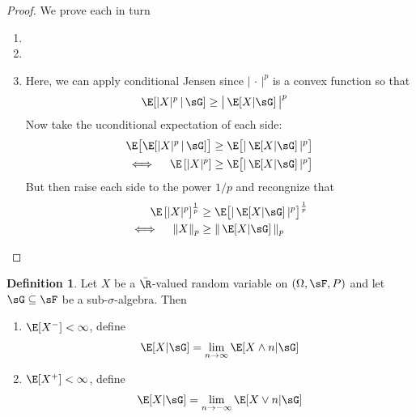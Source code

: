 \documentclass[12pt]{article}
\theoremstyle{plain}
\theoremstyle{definition}
\newtheorem{defn}[thm]{Definition}
\theoremstyle{remark}
\newcommand{\ra}{\rightarrow}
\newcommand{\limn}{\lim_{n\rightarrow\infty}}
\begin{document}
\begin{proof}
We prove each in turn
\begin{enumerate}[label=(\roman*)]
  \item
  \item
  \item Here, we can apply conditional Jensen since $|\,\cdot\,|^p$ is
    a convex function so that
    \begin{align*}
      \E[\lvert X\rvert^p\,|\,\sG]
      &\geq
      \big\lvert\,\E[X|\sG]\,\big\rvert^p
    \end{align*}
    Now take the uconditional expectation of each side:
    \begin{align*}
      \E\big[
      \E[\lvert X\rvert^p\,|\,\sG]
      \big]
      &\geq
      \E\big[
      \lvert\,\E[X|\sG]\,\rvert^p
      \big] \\
      \iff\quad
      \E\left[ \lvert X\rvert^p\right]
      &\geq
      \E\big[
      \lvert\,\E[X|\sG]\,\rvert^p
      \big]
    \end{align*}
    But then raise each side to the power $1/p$ and recongnize that
    \begin{align*}
      \E\left[ \lvert X\rvert^p\right]^{\frac{1}{p}}
      &\geq
      \E\big[
      \lvert\,\E[X|\sG]\,\rvert^p
      \big]^{\frac{1}{p}} \\
      \iff\quad
      \lVert X \rVert_p
      &\geq
      \lVert \, \E[X|\sG] \,\rVert_p
    \end{align*}
\end{enumerate}
\end{proof}

\begin{defn}
Let $X$ be a $\bar{\R}$-valued random variable on $(\Omega,\sF,P)$ and
let $\sG\subseteq \sF$ be a sub-$\sigma$-algebra. Then
\begin{enumerate}[label=(\roman*)]
  \item $\E[X^-]<\infty$, define
    \begin{align*}
      \E[X|\sG] = \limn \E[X\wedge n|\sG]
    \end{align*}
  \item $\E[X^+]<\infty$, define
    \begin{align*}
      \E[X|\sG] = \lim_{n\ra-\infty} \E[X\vee n|\sG]
    \end{align*}
\end{enumerate}
\end{defn}



\clearpage
\end{document}
